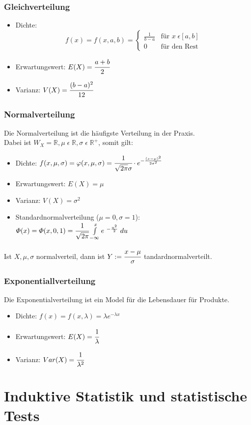 \documentclass[a4paper]{scrartcl}
\begin{document}
            \subsubsection{Gleichverteilung}
            \begin{itemize}
                \item Dichte: \[f(x) = f(x,a,b)=
                                \begin{cases}
                                    \frac{1}{b - a}     & \text{für } x \; \epsilon [a, b] \\
                                    0     & \text{für den Rest} 
                                \end{cases}
                            \] 
                \item Erwartungswert: \(E(X) = \cfrac{a+b}{2} \)
                \item Varianz: \(V(X) = \cfrac{(b-a)^2}{12} \)
            \end{itemize}
            \subsubsection{Normalverteilung}
                Die Normalverteilung ist die häufigste Verteilung in der Praxis.\\
                Dabei ist  \(W_X = \mathbb{R}, \mu \; \epsilon \; \mathbb{R}, \sigma \; \epsilon \; \mathbb{R}^+ \), somit gilt: 
                \begin{itemize}
                    \item Dichte: \( f(x, \mu, \sigma)  = \varphi(x, \mu, \sigma) = \cfrac{1}{\sqrt{2\pi} \sigma} \cdot e^{- \frac{(x - \mu)^2}{2 \sigma^2}} \) 
                    \item Erwartungswert: \(E(X) = \mu\)
                    \item Varianz: \(V(X) = \sigma^2\)
                    \item Standardnormalverteilung (\(\mu = 0, \sigma = 1\)):  \(\varPhi(x) = \varPhi(x,0,1) = \cfrac{1}{\sqrt{2\pi}} \int\limits_{-\infty}^xe^{\ - \frac{u^2}{2}} \; du\)
                \end{itemize}
                Ist \(X, \mu, \sigma\) normalverteil, dann ist \(Y := \cfrac{x - \mu}{\sigma}\) tandardnormalverteilt.
            \subsubsection{Exponentiallverteilung}
                Die Exponentialverteilung ist ein Model für die Lebensdauer für Produkte.
                \begin{itemize}
                    \item Dichte: \(f(x) = f(x, \lambda) = \lambda e^{-\lambda x}\) 
                    \item Erwartungswert: \(E(X) = \cfrac{1}{\lambda} \)
                    \item Varianz: \(Var(X) =  \cfrac{1}{\lambda^2} \)
                \end{itemize}
    \section{Induktive Statistik und statistische Tests}
\end{document}
